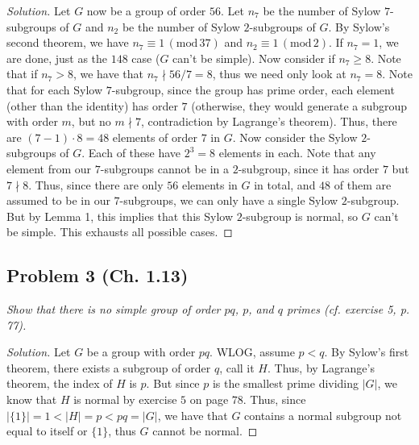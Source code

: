 \documentclass{article}
\begin{document}
\begin{proof}[Solution]
	Let $G$ now be a group of order $56$.
	Let $n_7$ be the number of Sylow $7$-subgroups of $G$
	and $n_2$ be the number of Sylow $2$-subgroups of $G$.
	By Sylow's second theorem, we have $n_7 \equiv 1\, (\mathrm{mod}\,37)$
	and $n_2 \equiv 1\, (\mathrm{mod}\,2)$.
	If $n_7 = 1$, we are done, just as the $148$ case ($G$ can't be simple).
	Now consider if $n_7 \geq 8$.
	Note that if $n_7 > 8$, we have that $n_7 \nmid 56/7 = 8$,
	thus we need only look at $n_7 = 8$.
	Note that for each Sylow $7$-subgroup,
	since the group has prime order,
	each element (other than the identity) has order $7$
	(otherwise, they would generate a subgroup with order $m$,
	but no $m \nmid 7$, contradiction by Lagrange's theorem).
	Thus, there are $(7-1)\cdot 8 = 48$ elements of order $7$ in $G$.
	Now consider the Sylow $2$-subgroups of $G$.
	Each of these have $2^3 = 8$ elements in each.
	Note that any element from our $7$-subgroups cannot be in
	a $2$-subgroup,
	since it has order $7$ but $7 \nmid 8$.
	Thus, since there are only $56$ elements in $G$ in total,
	and $48$ of them are assumed to be in our $7$-subgroups,
	we can only have a single Sylow $2$-subgroup.
	But by Lemma 1, this implies that this Sylow $2$-subgroup is normal,
	so $G$ can't be simple.
	This exhausts all possible cases.
\end{proof}

\subsection*{Problem 3 (Ch. 1.13)}
{\it Show that there is no simple group of order $pq$,
$p$, and $q$ primes (cf. exercise 5, p. 77).}
\begin{proof}[Solution]\let\qed\relax
	Let $G$ be a group with order $pq$.
	WLOG, assume $p < q$.
	By Sylow's first theorem,
	there exists a subgroup of order $q$, call it $H$.
	Thus, by Lagrange's theorem, the index of $H$ is $p$.
	But since $p$ is the smallest prime dividing $|G|$,
	we know that $H$ is normal by exercise $5$ on page $78$.
	Thus, since $|\{1\}| = 1 < |H| = p < pq = |G|$, we have that
	$G$ contains a normal subgroup not equal to itself or $\{1\}$,
	thus $G$ cannot be normal.
\end{proof}
\end{document}
